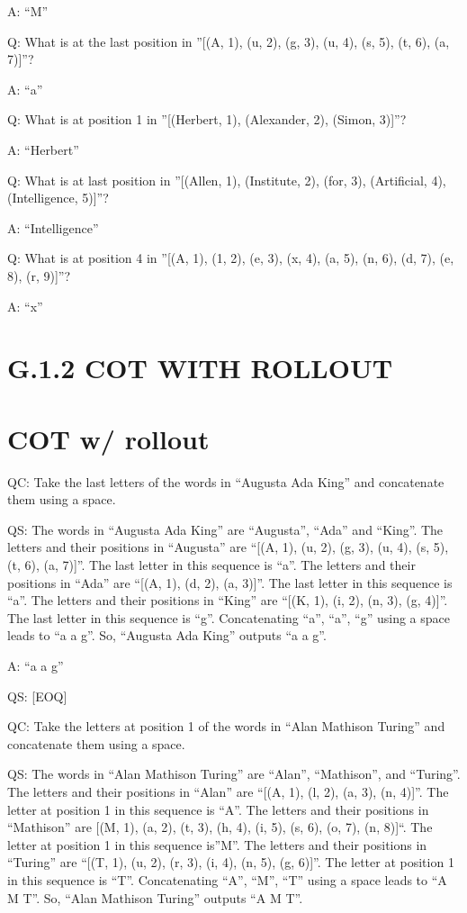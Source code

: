 \documentclass[
]{article}
\begin{document}
A: ``M''

Q: What is at the last position in ''{[}(A, 1), (u, 2), (g, 3), (u, 4),
(s, 5), (t, 6), (a, 7){]}''?

A: ``a''

Q: What is at position 1 in ''{[}(Herbert, 1), (Alexander, 2), (Simon,
3){]}''?

A: ``Herbert''

Q: What is at last position in ''{[}(Allen, 1), (Institute, 2), (for,
3), (Artificial, 4), (Intelligence, 5){]}''?

A: ``Intelligence''

Q: What is at position 4 in ''{[}(A, 1), (1, 2), (e, 3), (x, 4), (a, 5),
(n, 6), (d, 7), (e, 8), (r, 9){]}''?

A: ``x''

\section{G.1.2 COT WITH ROLLOUT}\label{g.1.2-cot-with-rollout}

\section{COT w/ rollout}\label{cot-w-rollout}

QC: Take the last letters of the words in ``Augusta Ada King'' and
concatenate them using a space.

QS: The words in ``Augusta Ada King'' are ``Augusta'', ``Ada'' and
``King''. The letters and their positions in ``Augusta'' are ``{[}(A,
1), (u, 2), (g, 3), (u, 4), (s, 5), (t, 6), (a, 7){]}''. The last letter
in this sequence is ``a''. The letters and their positions in ``Ada''
are ``{[}(A, 1), (d, 2), (a, 3){]}''. The last letter in this sequence
is ``a''. The letters and their positions in ``King'' are ``{[}(K, 1),
(i, 2), (n, 3), (g, 4){]}''. The last letter in this sequence is ``g''.
Concatenating ``a'', ``a'', ``g'' using a space leads to ``a a g''. So,
``Augusta Ada King'' outputs ``a a g''.

A: ``a a g''

QS: {[}EOQ{]}

QC: Take the letters at position 1 of the words in ``Alan Mathison
Turing'' and concatenate them using a space.

QS: The words in ``Alan Mathison Turing'' are ``Alan'', ``Mathison'',
and ``Turing''. The letters and their positions in ``Alan'' are ``{[}(A,
1), (l, 2), (a, 3), (n, 4){]}''. The letter at position 1 in this
sequence is ``A''. The letters and their positions in ``Mathison'' are
{[}(M, 1), (a, 2), (t, 3), (h, 4), (i, 5), (s, 6), (o, 7), (n, 8){]}``.
The letter at position 1 in this sequence is''M''. The letters and their
positions in ``Turing'' are ``{[}(T, 1), (u, 2), (r, 3), (i, 4), (n, 5),
(g, 6){]}''. The letter at position 1 in this sequence is ``T''.
Concatenating ``A'', ``M'', ``T'' using a space leads to ``A M T''. So,
``Alan Mathison Turing'' outputs ``A M T''.
\end{document}
